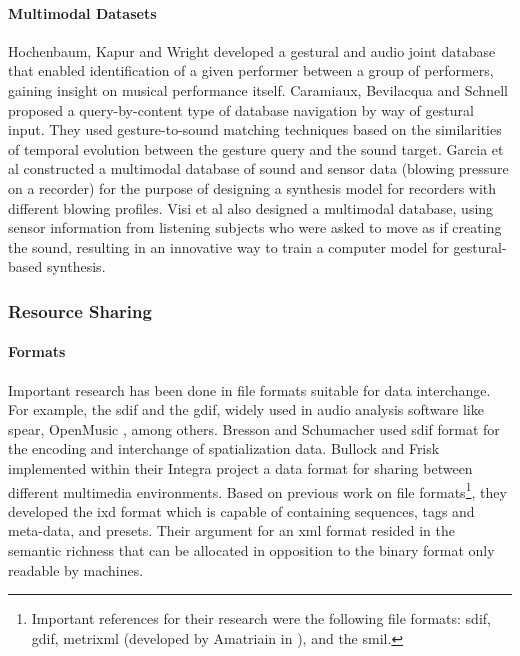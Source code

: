 \paragraph{Multimodal Datasets}
Hochenbaum, Kapur and Wright \parencite{Hochenbaum2010} developed a gestural and audio joint database that enabled identification of a given performer between a group of performers, gaining insight on musical performance itself. Caramiaux, Bevilacqua and Schnell \parencite{Caramiaux2011} proposed a query-by-content type of database navigation by way of gestural input. They used gesture-to-sound matching techniques based on the similarities of temporal evolution between the gesture query and the sound target. Garcia et al \parencite{Garcia2011} constructed a multimodal database of sound and sensor data (blowing pressure on a recorder) for the purpose of designing a synthesis model for recorders with different blowing profiles. Visi et al \parencite{fvisi:2017} also designed a multimodal database, using sensor information from listening subjects who were asked to move as if creating the sound, resulting in an innovative way to train a computer model for gestural-based synthesis.

\subsubsection{Resource Sharing}
\label{application:sharing}

\paragraph{Formats}
Important research has been done in file formats suitable for data interchange. For example, the \gls{sdif} and the \gls{gdif}, widely used in audio analysis software like \gls{spear}, OpenMusic \parencite{icmc/bbp2372.2004.004}, among others. Bresson and Schumacher \parencite{icmc/bbp2372.2004.004} used \gls{sdif} format for the encoding and interchange of spatialization data. Bullock and Frisk \parencite{icmc/bbp2372.2009.012} implemented within their Integra project a data format for sharing between different multimedia environments. Based on previous work on file formats\footnote{Important references for their research were the following file formats: \gls{sdif}, \gls{gdif}, \gls{metrixml} (developed by Amatriain in \parencite{Amatriain/2004/phdthesis}), and the \gls{smil}.}, they developed the \gls{ixd} format which is capable of containing sequences, tags and meta-data, and presets. Their argument for an \gls{xml} format resided in the semantic richness that can be allocated in opposition to the binary format only readable by machines. 

